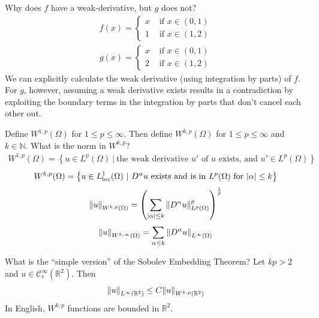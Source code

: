 \documentclass[avery5388,grid,frame]{flashcards}
\def\Rl{\mathbb{R}}
\begin{document}
\begin{flashcard}
    {Why does $f$ have a weak-derivative, but $g$ does not?
    \begin{equation*}
        \begin{aligned}
            f(x) = \begin{cases}
                x & \text{ if } x \in (0,1) \\
                1 & \text{ if } x \in (1,2)
            \end{cases}
        \end{aligned}
    \end{equation*}
    \begin{equation*}
        \begin{aligned}
            g(x) = \begin{cases}
                x & \text{ if } x \in (0,1) \\
                2 & \text{ if } x \in (1,2)
            \end{cases}
        \end{aligned}
    \end{equation*}}
    We can explicitly calculate the weak derivative (using integration by parts) of $f$.  For $g$, however, assuming a weak derivative exists results in a contradiction by exploiting the boundary terms in the integration by parts that don't cancel each other out.
\end{flashcard}

\begin{flashcard}
    {Define $W^{1,p}(\Omega)$ for $1 \leq p \leq \infty$.  Then define $W^{k,p}(\Omega)$ for $1 \leq p \leq \infty$ and $k \in \mathbb{N}$.  What is the norm in $W^{k,p}$?}
    \begin{align*}
        W^{1,p}(\Omega) = \left\{u \in L^p(\Omega)\ |\ \text{the weak derivative $u'$ of $u$ exists, and } u' \in L^p(\Omega)\right\}
    \end{align*}
    \begin{align*}
        W^{k,p}(\Omega) = \left\{u \in L^1_\text{loc}(\Omega)\ |\ D^\alpha u \text{ exists and is in } L^p(\Omega) \text{ for } \abs{\alpha} \leq k\right\}
    \end{align*}
    \begin{align*}
        \norm{u}_{W^{k,p}(\Omega)} = \qty(\sum_{\abs{\alpha}\leq k}\norm{D^\alpha u}_{L^p(\Omega)}^p)^{\frac{1}{p}}
    \end{align*}
    \begin{align*}
        \norm{u}_{W^{k,\infty}(\Omega)} = \sum_{\alpha \leq k} \norm{D^\alpha u}_{L^\infty(\Omega)}
    \end{align*}
\end{flashcard}

\begin{flashcard}
    {What is the ``simple version'' of the Sobolev Embedding Theorem?}
    Let $kp > 2$ and $u \in \mathcal{C}_c^\infty(\Rl^2)$.  Then
    \begin{align*}
        \norm{u}_{L^\infty(\Rl^2)} \leq C \norm{u}_{W^{k,p}(\Rl^2)}
    \end{align*}
    In English, $W^{k,p}$ functions are bounded in $\Rl^2$.
\end{flashcard}
\end{document}
